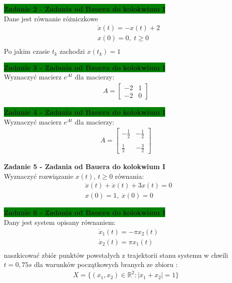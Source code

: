 \documentclass[a4paper,11pt]{article}
\begin{document}
\begin{framed}
\textbf{\colorbox{green}{Zadanie 2 - Zadania od Bauera do kolokwium I }} \\ 
Dane jest równanie różniczkowe 
\begin{align*}
&\dot{x}(t)=-x(t)+2 \\
&x(0)=0, \; t \geq 0 \\ 
\end{align*}
Po jakim czasie \( t_k \) zachodzi \( x(t_k) = 1 \)
\end{framed}

\begin{framed}
\textbf{\colorbox{green}{Zadanie 3 - Zadania od Bauera do kolokwium I }} \\ 
Wyznaczyć macierz \( e^{At} \) dla macierzy:
\begin{align*}
A = 
\begin{bmatrix}
-2 & 1 \\
-2 & 0
\end{bmatrix}
\end{align*}
\end{framed}

\begin{framed}
\textbf{\colorbox{green}{Zadanie 4 - Zadania od Bauera do kolokwium I }} \\ 
Wyznaczyć macierz \( e^{At} \) dla macierzy:
\begin{align*}
A = 
\begin{bmatrix}
-\frac{1}{2 }& -\frac{1}{2} \\ \\
\frac{1}{2} & -\frac{3}{2}
\end{bmatrix}
\end{align*}
\end{framed}

\begin{framed}
\textbf{Zadanie 5 - Zadania od Bauera do kolokwium I } \\ 
Wyznaczyć rozwiązanie \( x(t) \), \( t \geq 0 \) równania:
\begin{align*}
&\ddot{x}(t)+\dot{x}(t)+3x(t)=0 \\
&x(0)=1, \; \dot{x}(0)=0
\end{align*}
\end{framed}

\begin{framed}
\textbf{\colorbox{green}{Zadanie 6 - Zadania od Bauera do kolokwium I }} \\ 
Dany jest system opisany równaniem:
\begin{align*}
&\dot{x}_1(t)=-\pi x_2(t) \\
&\dot{x}_2(t)=\pi x_1(t) \\
\end{align*}
naszkicować zbiór punktów powstałych z trajektorii stanu systemu w chwili \( t = 0,75 s \) dla warunków początkowych branych ze zbioru :
\begin{align*}
X = \{ (x_1,x_2)\in \mathbb{R}^2 : |x_1+x_2|=1 \}
\end{align*}
\end{framed}
\end{document}
